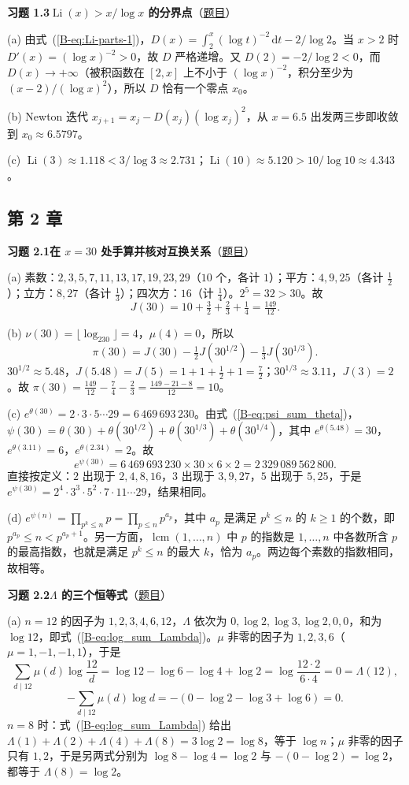 \documentclass[11pt,a4paper]{article}
\DeclareMathOperator{\Li}{Li}
\newcommand{\dd}{\,\mathrm{d}}
\newcommand{\bref}[1]{\ref*{B-#1}}
\newcommand{\Sol}[2]{%
  \par\addvspace{1.2em}\noindent
  \hypertarget{s:#1}{}\textbf{习题 #1\quad #2}\hfill{\small（\hyperlink{q:#1}{题目}）}\par
  \nopagebreak\smallskip}
\begin{document}
\Sol{1.3}{$\Li(x)>x/\log x$ 的分界点}
(a) 由式~(\bref{eq:Li-parts-1})，$D(x)=\int_2^x(\log t)^{-2}\dd t-2/\log2$。当 $x>2$ 时 $D'(x)=(\log x)^{-2}>0$，故 $D$ 严格递增。又 $D(2)=-2/\log2<0$，而 $D(x)\to+\infty$（被积函数在 $[2,x]$ 上不小于 $(\log x)^{-2}$，积分至少为 $(x-2)/(\log x)^2$），所以 $D$ 恰有一个零点 $x_0$。

(b) Newton 迭代 $x_{j+1}=x_j-D(x_j)(\log x_j)^2$，从 $x=6.5$ 出发两三步即收敛到 $x_0\approx6.5797$。

(c) $\Li(3)\approx1.118<3/\log3\approx2.731$；$\Li(10)\approx5.120>10/\log10\approx4.343$。

\subsection*{第 2 章}

\Sol{2.1}{在 $x=30$ 处手算并核对互换关系}
(a) 素数：$2,3,5,7,11,13,17,19,23,29$（$10$ 个，各计 $1$）；平方：$4,9,25$（各计 $\tfrac12$）；立方：$8,27$（各计 $\tfrac13$）；四次方：$16$（计 $\tfrac14$）。$2^5=32>30$。故
\[
  J(30)=10+\tfrac32+\tfrac23+\tfrac14=\tfrac{149}{12}.
\]

(b) $\nu(30)=\lfloor\log_230\rfloor=4$，$\mu(4)=0$，所以
\[
  \pi(30)=J(30)-\tfrac12J(30^{1/2})-\tfrac13J(30^{1/3}).
\]
$30^{1/2}\approx5.48$，$J(5.48)=J(5)=1+1+\tfrac12+1=\tfrac72$；$30^{1/3}\approx3.11$，$J(3)=2$。故
$\pi(30)=\tfrac{149}{12}-\tfrac74-\tfrac23=\tfrac{149-21-8}{12}=10$。

(c) $e^{\theta(30)}=2\cdot3\cdot5\cdots29=6\,469\,693\,230$。由式~(\bref{eq:psi_sum_theta})，$\psi(30)=\theta(30)+\theta(30^{1/2})+\theta(30^{1/3})+\theta(30^{1/4})$，其中 $e^{\theta(5.48)}=30$，$e^{\theta(3.11)}=6$，$e^{\theta(2.34)}=2$。故
\[
  e^{\psi(30)}=6\,469\,693\,230\times30\times6\times2=2\,329\,089\,562\,800 .
\]
直接按定义：$2$ 出现于 $2,4,8,16$，$3$ 出现于 $3,9,27$，$5$ 出现于 $5,25$，于是 $e^{\psi(30)}=2^4\cdot3^3\cdot5^2\cdot7\cdot11\cdots29$，结果相同。

(d) $e^{\psi(n)}=\prod_{p^k\le n}p=\prod_{p\le n}p^{a_p}$，其中 $a_p$ 是满足 $p^k\le n$ 的 $k\ge1$ 的个数，即 $p^{a_p}\le n<p^{a_p+1}$。另一方面，$\operatorname{lcm}(1,\dots,n)$ 中 $p$ 的指数是 $1,\dots,n$ 中各数所含 $p$ 的最高指数，也就是满足 $p^k\le n$ 的最大 $k$，恰为 $a_p$。两边每个素数的指数相同，故相等。

\Sol{2.2}{$\Lambda$ 的三个恒等式}
(a) $n=12$ 的因子为 $1,2,3,4,6,12$，$\Lambda$ 依次为 $0,\log2,\log3,\log2,0,0$，和为 $\log12$，即式~(\bref{eq:log_sum_Lambda})。$\mu$ 非零的因子为 $1,2,3,6$（$\mu=1,-1,-1,1$），于是
\[
  \sum_{d\mid12}\mu(d)\log\frac{12}d=\log12-\log6-\log4+\log2=\log\frac{12\cdot2}{6\cdot4}=0=\Lambda(12),
\]
\[
  -\sum_{d\mid12}\mu(d)\log d=-(0-\log2-\log3+\log6)=0 .
\]
$n=8$ 时：式~(\bref{eq:log_sum_Lambda}) 给出 $\Lambda(1)+\Lambda(2)+\Lambda(4)+\Lambda(8)=3\log2=\log8$，等于 $\log n$；$\mu$ 非零的因子只有 $1,2$，于是另两式分别为 $\log8-\log4=\log2$ 与 $-(0-\log2)=\log2$，都等于 $\Lambda(8)=\log2$。
\end{document}
